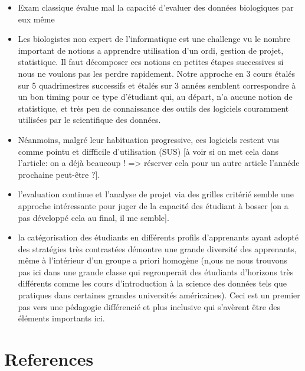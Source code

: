 \documentclass[
]{article}
\begin{document}
\begin{itemize}
\item
  Exam classique évalue mal la capacité d'evaluer des données
  biologiques par eux même
\item
  Les biologistes non expert de l'informatique est une challenge vu le
  nombre important de notions a apprendre utilisation d'un ordi, gestion
  de projet, statistique. Il faut décomposer ces notions en petites
  étapes successives si nous ne voulons pas les perdre rapidement. Notre
  approche en 3 cours étalés sur 5 quadrimestres successifs et étalés
  sur 3 années semblent correspondre à un bon timing pour ce type
  d'étudiant qui, au départ, n'a aucune notion de statistique, et très
  peu de connaissance des outils des logiciels couramment utilisées par
  le scientifique des données.
\item
  Néanmoins, malgré leur habituation progressive, ces logiciels restent
  vus comme pointu et diffficile d'utilisation (SUS) {[}à voir si on met
  cela dans l'article: on a déjà beaucoup ! =\textgreater{} réserver
  cela pour un autre article l'annéde prochaine peut-être ?{]}.
\item
  l'evaluation continue et l'analyse de projet via des grilles critérié
  semble une approche intéressante pour juger de la capacité des
  étudiant à bosser {[}on a pas développé cela au final, il me
  semble{]}.
\item
  la catégorisation des étudiants en différents profils d'apprenants
  ayant adopté des stratégies très contrastées démontre une grande
  diversité des apprenants, même à l'intérieur d'un groupe a priori
  homogène (n,ous ne nous trouvons pas ici dans une grande classe qui
  regrouperait des étudiants d'horizons très différents comme les cours
  d'introduction à la science des données tels que pratiques dans
  certaines grandes universités américaines). Ceci est un premier pas
  vers une pédagogie différencié et plus inclusive qui s'avèrent être
  des éléments importants ici.
\end{itemize}

\hypertarget{references}{%
\section*{References}\label{references}}
\end{document}
